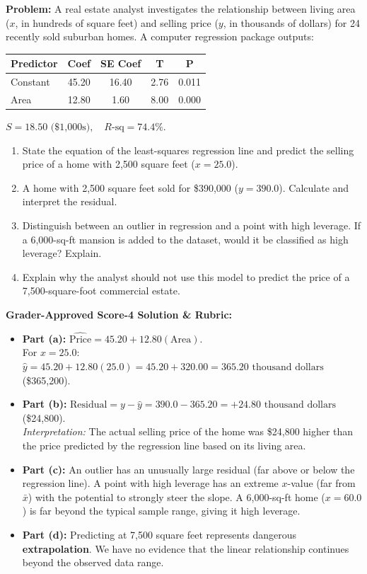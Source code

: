 \begin{frqrubricbox}
\textbf{Problem:} A real estate analyst investigates the relationship between living area ($x$, in hundreds of square feet) and selling price ($y$, in thousands of dollars) for 24 recently sold suburban homes. A computer regression package outputs:
\begin{center}
\begin{tabular}{lcccc}
\toprule
\textbf{Predictor} & \textbf{Coef} & \textbf{SE Coef} & \textbf{T} & \textbf{P} \\
\midrule
Constant & 45.20 & 16.40 & 2.76 & 0.011 \\
Area & 12.80 & 1.60 & 8.00 & 0.000 \\
\bottomrule
\end{tabular}
\end{center}
$S = 18.50\text{ (\$1,000s)}, \quad R\text{-sq} = 74.4\%$.
\begin{enumerate}[label=(\alph*)]
  \item State the equation of the least-squares regression line and predict the selling price of a home with 2,500 square feet ($x = 25.0$).
  \item A home with 2,500 square feet sold for \$390,000 ($y = 390.0$). Calculate and interpret the residual.
  \item Distinguish between an outlier in regression and a point with high leverage. If a 6,000-sq-ft mansion is added to the dataset, would it be classified as high leverage? Explain.
  \item Explain why the analyst should not use this model to predict the price of a 7,500-square-foot commercial estate.
\end{enumerate}

\textbf{Grader-Approved Score-4 Solution \& Rubric:}
\begin{itemize}[leftmargin=1.2em]
  \item \textbf{Part (a):} $\widehat{\text{Price}} = 45.20 + 12.80(\text{Area})$.\\
  For $x = 25.0$: $\hat{y} = 45.20 + 12.80(25.0) = 45.20 + 320.00 = 365.20\text{ thousand dollars}$ (\$365,200).
  \item \textbf{Part (b):} $\text{Residual} = y - \hat{y} = 390.0 - 365.20 = +24.80\text{ thousand dollars}$ (\$24,800).\\
  \textit{Interpretation:} The actual selling price of the home was \$24,800 higher than the price predicted by the regression line based on its living area.
  \item \textbf{Part (c):} An outlier has an unusually large residual (far above or below the regression line). A point with high leverage has an extreme $x$-value (far from $\bar{x}$) with the potential to strongly steer the slope. A 6,000-sq-ft home ($x = 60.0$) is far beyond the typical sample range, giving it high leverage.
  \item \textbf{Part (d):} Predicting at 7,500 square feet represents dangerous \textbf{extrapolation}. We have no evidence that the linear relationship continues beyond the observed data range.
\end{itemize}
\end{frqrubricbox}

